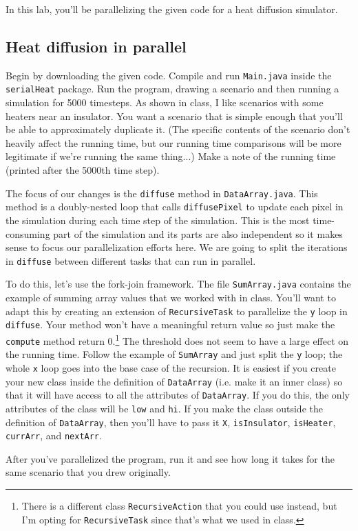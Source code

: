 \documentclass{article}
\begin{document}
In this lab, you'll be parallelizing the given code for a heat
diffusion simulator.

\subsection*{Heat diffusion in parallel}

Begin by downloading the given code.
Compile and run {\tt Main.java} inside the {\tt serialHeat} package.
Run the program, drawing a scenario and then running a simulation for
5000 timesteps.
As shown in class, I like scenarios with some heaters near an
insulator.
You want a scenario that is simple enough that you'll be able to
approximately duplicate it.
(The specific contents of the scenario don't heavily affect the
running time, but our running time comparisons will be more legitimate
if we're running the same thing...)
Make a note of the running time (printed after the 5000th time step).

The focus of our changes is the {\tt diffuse} method in
{\tt DataArray.java}.
This method is a doubly-nested loop that calls {\tt diffusePixel} to update
each pixel in the simulation during each time step of the simulation.
This is the most time-consuming part of the simulation and its parts
are also independent so it makes sense to focus our parallelization
efforts here.
We are going to split the iterations in {\tt diffuse} between different tasks that
can run in parallel.

To do this, let's use the fork-join framework.
The file {\tt SumArray.java} contains the example of summing array
values that we worked with in class.
You'll want to adapt this by creating an extension of
{\tt RecursiveTask} to parallelize the {\tt y} loop in {\tt diffuse}.
Your method won't have a meaningful return value so just make the
{\tt compute} method return 0.\footnote{There is a different class
{\tt RecursiveAction} that you could use instead, but I'm opting for
{\tt RecursiveTask} since that's what we used in class.}
The threshold does not seem to have a large effect on the running
time.
Follow the example of {\tt SumArray} and just split the {\tt y} loop;
the whole {\tt x} loop goes into the base case of the recursion.
It is easiest if you create your new class inside the definition of
{\tt DataArray} (i.e. make it an inner class) so that it will have
access to all the attributes of {\tt DataArray}.
If you do this, the only attributes of the class will be {\tt low} and
{\tt hi}.
If you make the class outside the definition of {\tt DataArray}, then
you'll have to pass it {\tt X}, {\tt isInsulator}, {\tt isHeater},
{\tt currArr}, and {\tt nextArr}.

After you've parallelized the program, run it and see how long
it takes for the same scenario that you drew originally.

\vfill
\end{document}
